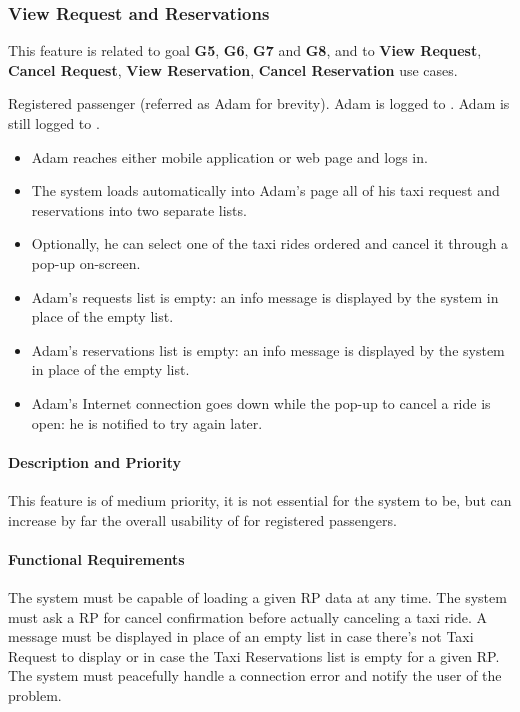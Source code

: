 \subsubsection{View Request and Reservations}
This feature is related to goal \textbf{G5}, \textbf{G6}, \textbf{G7} and \textbf{G8}, and to \textbf{View Request}, \textbf{Cancel Request}, \textbf{View Reservation}, \textbf{Cancel Reservation} use cases.
\begin{itemize}
	 Registered passenger (referred as Adam for brevity).
	 Adam is logged to \myTaxiService{}.
	 Adam is still logged to \myTaxiService{}.
	\begin{itemize}
		\item Adam reaches either \myTaxiService{} mobile application or web page and logs in.
		\item The system loads automatically into Adam's page all of his taxi request and reservations into two separate lists.
		\item Optionally, he can select one of the taxi rides ordered and cancel it through a pop-up on-screen.
	\end{itemize}
	\begin{itemize}
		\item Adam's requests list is empty: an info message is displayed by the system in place of the empty list.
		\item Adam's reservations list is empty: an info message is displayed by the system in place of the empty list.
		\item Adam's Internet connection goes down while the pop-up to cancel a ride is open: he is notified to try again later.
	\end{itemize}
\end{itemize}
\paragraph{Description and Priority}
This feature is of medium priority, it is not essential for the system to be, but can increase by far the overall usability of \myTaxiService{} for registered passengers.\par
\paragraph{Functional Requirements}
\begin{itemize}
	 The system must be capable of loading a given RP data at any time.
	 The system must ask a RP for cancel confirmation before actually canceling a taxi ride.
	 A message must be displayed in place of an empty list in case there's not Taxi Request to display or in case the Taxi Reservations list is empty for a given RP.
	 The system must peacefully handle a connection error and notify the user of the problem.
\end{itemize}
